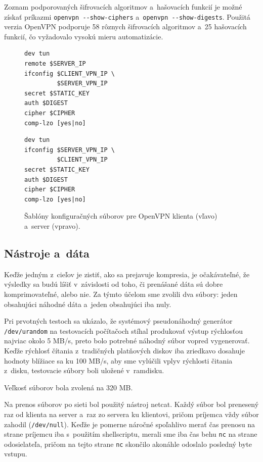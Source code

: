\documentclass[12pt,a4paper]{article}
\begin{document}
Zoznam podporovaných šifrovacích algoritmov a~hašovacích funkcií je možné
získať prí\-kaz\-mi \verb|openvpn --show-ciphers| a~\verb|openvpn --show-digests|.
Použitá verzia OpenVPN podporuje 58 rôznych šifrovacích algoritmov a~25
hašovacích funkcií, čo vyžadovalo vysokú mieru automatizácie.

\begin{figure}
    \begin{minipage}{.49\linewidth}\centering
        \begin{BVerbatim}
dev tun
remote $SERVER_IP
ifconfig $CLIENT_VPN_IP \
         $SERVER_VPN_IP
secret $STATIC_KEY
auth $DIGEST
cipher $CIPHER
comp-lzo [yes|no]
        \end{BVerbatim}
    \end{minipage}
    \begin{minipage}{.49\linewidth}\centering
        \begin{BVerbatim}
dev tun
ifconfig $SERVER_VPN_IP \
         $CLIENT_VPN_IP
secret $STATIC_KEY
auth $DIGEST
cipher $CIPHER
comp-lzo [yes|no]
        \end{BVerbatim}
    \end{minipage}
    \caption{Šablóny konfiguračných súborov pre OpenVPN klienta (vľavo)
             a~server (vpravo).}
    \label{fig:openvpn-config-templates}
\end{figure}

\subsection{Nástroje a~dáta}

Keďže jedným z~cieľov je zistiť, ako sa prejavuje kompresia, je
očakávateľné, že výsledky sa budú líšiť v~závislosti od toho, či prenášané
dáta sú dobre komprimovateľné, alebo nie. Za týmto účelom sme zvolili dva
súbory: jeden obsahujúci náhodné dáta a~jeden obsahujúci iba nuly.

Pri prvotných testoch sa ukázalo, že systémový pseudonáhodný generátor
\verb|/dev/urandom| na testovacích počítačoch stíhal produkovať výstup
rýchlosťou najviac okolo 5 MB/s, preto bolo potrebné náhodný súbor vopred
vygenerovať. Keďže rýchlosť čítania z~tradičných platňových diskov iba
zriedkavo dosahuje hodnoty blížiace sa ku 100 MB/s, aby sme vylúčili vplyv
rýchlosti čitania z~disku, testovacie súbory boli uložené v~ramdisku.

Veľkosť súborov bola zvolená na 320 MB.

Na prenos súborov po sieti bol použitý nástroj netcat. Každý súbor bol
prenesený raz od klienta na server a~raz zo servera ku klientovi, pričom
príjemca vždy súbor zahodil (\verb|/dev/null|). Keďže je pomerne náročné
spoľahlivo merať čas prenosu na strane príjemcu iba s~použitím
shellscriptu, merali sme iba čas behu \verb|nc| na strane odosielateľa,
pričom na tejto strane \verb|nc| skončilo akonáhle odoslalo posledný byte
vstupu.
\end{document}
